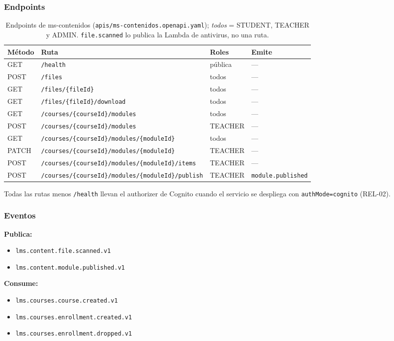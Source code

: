 \subsubsection{Endpoints}
\begin{table}[htbp]
\centering\footnotesize
\begin{tabularx}{\textwidth}{lXll}
\toprule
Método & Ruta & Roles & Emite \\
\midrule
GET   & \texttt{/health} & pública & --- \\
POST  & \texttt{/files} & todos & --- \\
GET   & \texttt{/files/\{fileId\}} & todos & --- \\
GET   & \texttt{/files/\{fileId\}/download} & todos & --- \\
GET   & \texttt{/courses/\{courseId\}/modules} & todos & --- \\
POST  & \texttt{/courses/\{courseId\}/modules} & TEACHER & --- \\
GET   & \texttt{/courses/\{courseId\}/modules/\{moduleId\}} & todos & --- \\
PATCH & \texttt{/courses/\{courseId\}/modules/\{moduleId\}} & TEACHER & --- \\
POST  & \texttt{/courses/\{courseId\}/modules/\{moduleId\}/items} & TEACHER & --- \\
POST  & \texttt{/courses/\{courseId\}/modules/\{moduleId\}/publish} & TEACHER & \texttt{module.published} \\
\bottomrule
\end{tabularx}
\caption{Endpoints de ms-contenidos (\texttt{apis/ms-contenidos.openapi.yaml}); \textit{todos} = STUDENT, TEACHER y ADMIN. \texttt{file.scanned}
lo publica la Lambda de antivirus, no una ruta.}
\end{table}

Todas las rutas menos \texttt{/health} llevan el authorizer de Cognito cuando el servicio se despliega con
\texttt{authMode=cognito} (REL-02).

\subsubsection{Eventos}
\textbf{Publica:}
\begin{itemize}
  \item \texttt{lms.content.file.scanned.v1}
  \item \texttt{lms.content.module.published.v1}
\end{itemize}

\textbf{Consume:}
\begin{itemize}
  \item \texttt{lms.courses.course.created.v1}
  \item \texttt{lms.courses.enrollment.created.v1}
  \item \texttt{lms.courses.enrollment.dropped.v1}
\end{itemize}

